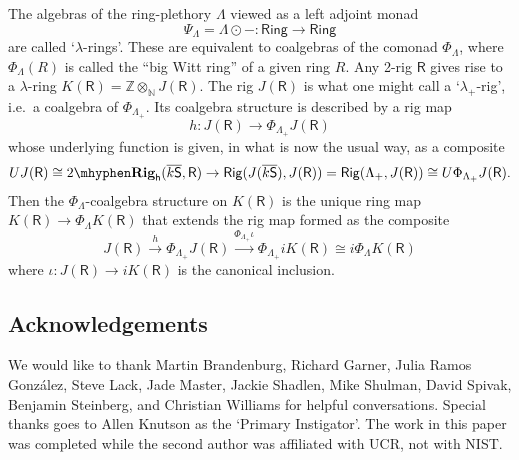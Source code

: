 \documentclass[12pt,reqno]{amsart}
\theoremstyle{plain}
\theoremstyle{definition}
\theoremstyle{remark}
\newcommand{\maps}{\colon}
\newcommand{\category}[1]{\mathsf{#1}}
\newcommand{\N}{\mathbb N}
\newcommand{\R}{\category R}
\renewcommand{\S}{\category S}
\newcommand{\Z}{\mathbb Z}
\newcommand{\namedcat}[1]{\mathsf{#1}}
\newcommand{\Rig}{\namedcat{Rig}}
\newcommand{\Ring}{\namedcat{Ring}}
\newcommand{\TRig}{2\mhyphen\namedbicat{Rig}}
\newcommand{\namedbicat}[1]{\mathbf{#1}}
\newcommand{\ho}{_\mathsf{h}}
\newcommand{\ksbar}{\overline{k\S}}
\numberwithin{thm}{section}
\begin{document}
The algebras of the ring-plethory $\Lambda$ viewed as a left adjoint monad 
\[  
    \Psi_\Lambda = \Lambda \odot - \maps \Ring \to \Ring 
\]
are called `$\lambda$-rings'. These are equivalent to coalgebras of the comonad $\Phi_\Lambda$, where $\Phi_\Lambda(R)$ is called the ``big Witt ring'' of a given ring $R$. Any 2-rig $\R$ gives rise to a $\lambda$-ring $K(\R) = \Z \otimes_{\N} J(\R)$. The rig $J(\R)$ is what one might call a `$\lambda_+$-rig', i.e.\ a coalgebra of $\Phi_{\Lambda_+}$. Its coalgebra structure is described by a rig map
\[ 
    h\maps J(\R) \to \Phi_{\Lambda_+}J(\R) 
\]
whose underlying function is given, in what is now the usual way, as a composite 
\[
    UJ(\R) \cong \TRig\ho(\ksbar, \R) \to \Rig(J(\ksbar), J(\R)) = \Rig(\Lambda_+, J(\R)) \cong U\Phi_{\Lambda_+}J(\R).
\]
Then the $\Phi_\Lambda$-coalgebra structure on $K(\R)$ is the unique ring map $K(\R) \to \Phi_\Lambda K(\R)$ that extends the rig map formed as the composite 
\[
    J(\R) \stackrel{h}{\to} \Phi_{\Lambda_+}J(\R) \stackrel{\Phi_{\Lambda_+}\iota}{\to} \Phi_{\Lambda_+} iK(\R) \cong i\Phi_\Lambda K(\R)
\]
where $\iota\maps J(\R) \to iK(\R)$ is the canonical inclusion. 

\subsection*{Acknowledgements}

We would like to thank Martin Brandenburg, Richard Garner, Julia Ramos Gonz\'alez, Steve Lack, Jade Master, Jackie Shadlen, Mike Shulman, David Spivak, Benjamin Steinberg, and Christian Williams for helpful conversations. Special thanks goes to Allen Knutson as the `Primary Instigator'. The work in this paper was completed while the second author was affiliated with UCR, not with NIST.




\end{document}
